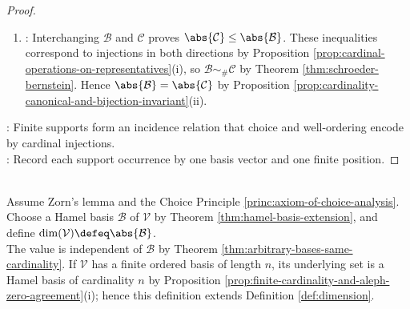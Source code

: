 \begin{theorem}
\begin{proof}
\begin{enumerate}[label=(\roman*)]
Then $\mathbf{b}\mapsto(\mathbf{c}_{\mathbf{b}},\mathbf{b})$ injects $\mathcal{B}$ into $D$. Fix a well-order of $\mathcal{B}$ by Principle \ref{princ:ordinal-foundations}(iv), let $p_{\mathbf{c}}(\mathbf{b})\in\N$ be position of $\mathbf{b}$ in the induced ordering of the finite set $S_{\mathbf{c}}$. The map $(\mathbf{c},\mathbf{b})\mapsto(\mathbf{c},p_{\mathbf{c}}(\mathbf{b}))$ injects $D$ into $\mathcal{C}\times\N$. Hence $\abs{\mathcal{B}}\leq\abs{D}\leq\abs{\mathcal{C}\times\N}$ by Proposition \ref{prop:cardinal-operations-on-representatives}(i).\\
By Proposition \ref{prop:cardinal-operations-on-representatives}(iv) and Proposition \ref{prop:finite-cardinality-and-aleph-zero-agreement}(iii), $\abs{\mathcal{C}\times\N}=\abs{\mathcal{C}}\aleph_0$.\\
Since $\mathcal{C}$ is infinite, $\aleph_0\leq\abs{\mathcal{C}}$ by Proposition \ref{prop:finite-cardinality-and-aleph-zero-agreement}(iv), so $\abs{\mathcal{C}}\aleph_0=\abs{\mathcal{C}}$ by Theorem \ref{thm:infinite-cardinal-absorption-reference}(ii). Therefore $\abs{\mathcal{B}}\leq\abs{\mathcal{C}}$.
\item {}: Interchanging $\mathcal{B}$ and $\mathcal{C}$ proves $\abs{\mathcal{C}}\leq\abs{\mathcal{B}}$. These inequalities correspond to injections in both directions by Proposition \ref{prop:cardinal-operations-on-representatives}(i), so $\mathcal{B}\sim_{\#}\mathcal{C}$ by Theorem \ref{thm:schroeder-bernstein}. Hence $\abs{\mathcal{B}}=\abs{\mathcal{C}}$ by Proposition \ref{prop:cardinality-canonical-and-bijection-invariant}(ii).
\end{enumerate}
: Finite supports form an incidence relation that choice and well-ordering encode by cardinal injections.\\
: Record each support occurrence by one basis vector and one finite position.
\end{proof}
\end{theorem}

\begin{definition} \label{def:hamel-dimension} \\
Assume Zorn's lemma and the Choice Principle \ref{princ:axiom-of-choice-analysis}. Choose a Hamel basis $\mathcal{B}$ of $\mathcal{V}$ by Theorem \ref{thm:hamel-basis-extension}, and define $\dim(\mathcal{V})\defeq\abs{\mathcal{B}}$.\\
The value is independent of $\mathcal{B}$ by Theorem \ref{thm:arbitrary-bases-same-cardinality}. If $\mathcal{V}$ has a finite ordered basis of length $n$, its underlying set is a Hamel basis of cardinality $n$ by Proposition \ref{prop:finite-cardinality-and-aleph-zero-agreement}(i); hence this definition extends Definition \ref{def:dimension}.
\end{definition}
